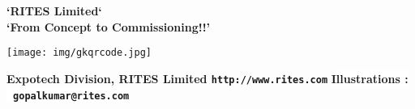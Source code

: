 \pagecolor[HTML]{0E0407}   %

\begin{center}
\begin{minipage}{.8\textwidth}
\color{Cornsilk}\Large\bfseries

\begin{center}
\huge\bfseries\sffamily\color{lime}`RITES Limited` \\ `From Concept to Commissioning!!'
\end{center}




\end{minipage}
\end{center}




\begin{center}
\texttt{[image: img/gkqrcode.jpg]}

\vspace*{\baselineskip}
\textbf{\textcolor{red!80}{Expotech Division, RITES Limited \texttt{http://www.rites.com}}}
\vspace*{\baselineskip}
\colorbox{white}{\textbf{\textcolor{red!60}{Illustrations : \textbullet\ \texttt{gopalkumar@rites.com}}}   }
\end{center}





